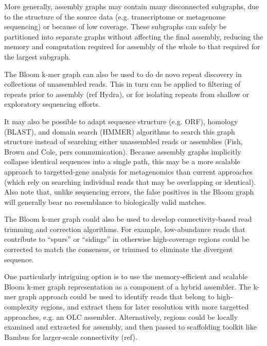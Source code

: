 \documentclass[12pt]{article} \usepackage{simplemargins}
\begin{document}
More generally, assembly graphs may contain many disconnected
subgraphs, due to the structure of the source data (e.g. transcriptome
or metagenome sequencing) or because of low coverage.  These subgraphs
can safely be partitioned into separate graphs without affecting the
final assembly, reducing the memory and computation required for
assembly of the whole to that required for the largest subgraph.

The Bloom k-mer graph can also be used to do de novo repeat discovery
in collections of unassembled reads.  This in turn can be applied to
filtering of repeats prior to assembly (ref Hydra), or for isolating
repeats from shallow or exploratory sequencing efforts.

It may also be possible to adapt sequence structure (e.g. ORF),
homology (BLAST), and domain search (HMMER) algorithms to search this
graph structure instead of searching either unassembled reads or
assemblies (Fish, Brown and Cole, pers communication).  Because assembly graphs implicitly collapse identical
sequences into a single path, this may be a more scalable approach to
targetted-gene analysis for metagenomics than current approaches
(which rely on searching individual reads that may be overlapping or identical).  Also note that, unlike
sequencing errors, the false positives in the Bloom graph will
generally bear no resemblance to biologically valid matches.

The Bloom k-mer graph could also be used to develop connectivity-based
read trimming and correction algorithms.  For example, low-abundance
reads that contribute to ``spurs'' or ``sidings'' in otherwise
high-coverage regions could be corrected to match the
consensus, or trimmed to eliminate the divergent sequence.

One particularly intriguing option is to use the memory-efficient and
scalable Bloom k-mer graph representation as a component of a hybrid
assembler.  The k-mer graph approach could be used to identify
reads that belong to high-complexity regions, and extract them for
later resolution with more targetted approaches, e.g. an OLC assembler.
Alternatively, regions could be locally examined and extracted for
assembly, and then passed to scaffolding toolkit like Bambus for 
larger-scale connectivity (ref).
\end{document}
